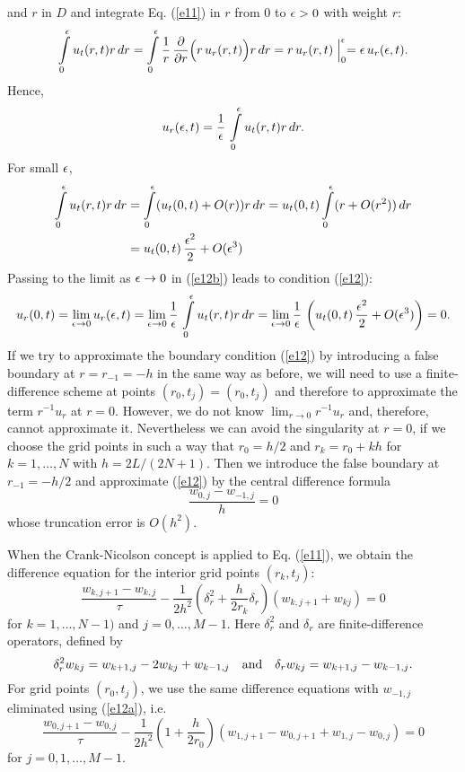 \begin{example}
and $r$ in $D$ and integrate Eq. (\ref{e11}) in $r$ from $0$ to ${\epsilon}>0$ with weight $r$:
\[
\int\limits_{0}^{{\epsilon}}u_{t}(r,t) r \, dr = \int\limits_{0}^{{\epsilon}}\frac{1}{r}\, \frac{{\partial}}{{\partial} r}\Bigl(r \, u_{r}(r,t)\Bigr) r \, dr
=r \, u_{r}(r,t)\Bigm\vert_{0}^{{\epsilon}}= {\epsilon} \, u_{r}({\epsilon},t).
\]
Hence,
\begin{equation}
u_{r}({\epsilon},t)=\frac{1}{{\epsilon}} \, \int\limits_{0}^{{\epsilon}}u_{t}(r,t) r \, dr .  \label{e12b}
\end{equation}
For small ${\epsilon}$,
\[\begin{split}
\int\limits_{0}^{{\epsilon}}u_{t}(r,t) r \, dr &= \int\limits_{0}^{{\epsilon}}(u_{t}(0,t)+O(r)) r \, dr=
u_{t}(0,t)\int\limits_{0}^{{\epsilon}} (r + O(r^2)) \, dr \\
&=u_{t}(0,t) \, \frac{{\epsilon}^2}{2} + O({\epsilon}^3)
\end{split}\]
Passing to the limit as ${\epsilon}\to 0$ in (\ref{e12b}) leads to condition (\ref{e12}):
\[
u_{r}(0,t)=\lim_{{\epsilon}\to 0} u_{r}({\epsilon},t)=\lim_{{\epsilon}\to 0} \frac{1}{{\epsilon}} \, \int\limits_{0}^{{\epsilon}}u_{t}(r,t) r \, dr
=\lim_{{\epsilon}\to 0} \frac{1}{{\epsilon}} \, \left(u_{t}(0,t) \, \frac{{\epsilon}^2}{2} + O({\epsilon}^3) \right)=0.
\]
If we try to approximate the boundary condition (\ref{e12}) by introducing a false boundary at $r=r_{-1}=-h$ in the same way as before,
we will need to use a finite-difference scheme at points $(r_{0},t_j)=(r_{0},t_j)$ and therefore to approximate the term $r^{-1}u_{r}$ at $r=0$.
However, we do not know $\lim_{r\to 0}r^{-1}u_{r}$ and, therefore, cannot approximate it. Nevertheless we can avoid the singularity at $r=0$, if we choose
the grid points in such a way that $r_{0}=h/2$ and $r_{k}=r_0+k h$ for $k=1,\dots,N$ with $h=2L/(2N+1)$. Then we introduce the false boundary at $r_{-1}=-h/2$ and approximate
(\ref{e12}) by the central difference formula
\begin{equation}
\frac{w_{0,j}-w_{-1,j}}{h}=0  \label{e12a}
\end{equation}
whose truncation error is $O(h^2)$.

When the Crank-Nicolson concept is applied to Eq. (\ref{e11}),
we obtain the difference equation for the interior grid points $(r_k,t_j)$:
\begin{equation}
\frac{w_{k,j+1}-w_{k,j}}{\tau}-
\frac{1}{2h^2}\left(\delta_{r}^2+\frac{h}{2r_{k}}\delta_{r}\right)
\left(w_{k,j+1}+w_{kj}\right)=0  \label{e13}
\end{equation}
for $k=1,\dots,N-1)$ and $j=0,\dots,M-1$.
Here $\delta^2_{r}$ and $\delta_{r}$ are finite-difference operators, defined
by
\begin{equation}
\delta^2_{r}w_{kj}=w_{k+1,j}-2w_{kj}+w_{k-1,j} \quad {\rm and} \quad
\delta_{r}w_{kj}=w_{k+1,j}-w_{k-1,j}.  \label{e14}
\end{equation}
For grid points $(r_0,t_j)$, we use the same difference equations with $w_{-1,j}$ eliminated using
(\ref{e12a}), i.e.
\begin{equation}
\frac{w_{0,j+1}-w_{0,j}}{\tau}-
\frac{1}{2h^2}\left(1+\frac{h}{2r_{0}}\right)
\left(w_{1,j+1}-w_{0,j+1}+w_{1,j}-w_{0,j}\right)=0 
\end{equation}
for $j=0, 1, \dots, M-1$.


\end{example}
